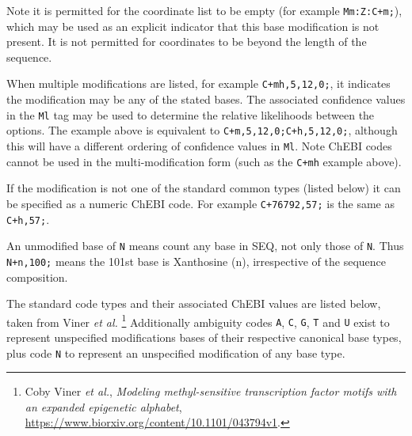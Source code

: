 \documentclass[10pt]{article}
\begin{document}
\begin{description}
Note it is permitted for the coordinate list to be empty (for example {\tt Mm:Z:C+m;}), which may be used as an explicit indicator that this base modification is not present.
It is not permitted for coordinates to be beyond the length of the sequence.

When multiple modifications are listed, for example {\tt C+mh,5,12,0;}, it indicates the modification may be any of the stated bases.
The associated confidence values in the {\tt Ml} tag may be used to determine the relative likelihoods between the options.
The example above is equivalent to {\tt C+m,5,12,0;C+h,5,12,0;}, although this will have a different ordering of confidence values in {\tt Ml}.
Note ChEBI codes cannot be used in the multi-modification form (such as the {\tt C+mh} example above).

If the modification is not one of the standard common types (listed below) it can be specified as a numeric ChEBI code.
For example {\tt C+76792,57;} is the same as {\tt C+h,57;}.

An unmodified base of {\tt N} means count any base in {\sf SEQ}, not only those of {\tt N}.
Thus {\tt N+n,100;} means the 101st base is Xanthosine (n), irrespective of the sequence composition.

The standard code types and their associated ChEBI values are listed
below, taken from Viner {\it et al.}%
\footnote{Coby Viner {\it et al.}, \emph{Modeling methyl-sensitive
transcription factor motifs with an expanded epigenetic alphabet}, \url{https://www.biorxiv.org/content/10.1101/043794v1}.}
Additionally ambiguity codes {\tt A}, {\tt C}, {\tt G}, {\tt T} and {\tt U}
exist to represent unspecified modifications bases of their respective
canonical base types, plus code {\tt N} to represent an unspecified
modification of any base type.


\end{description}
\end{document}
